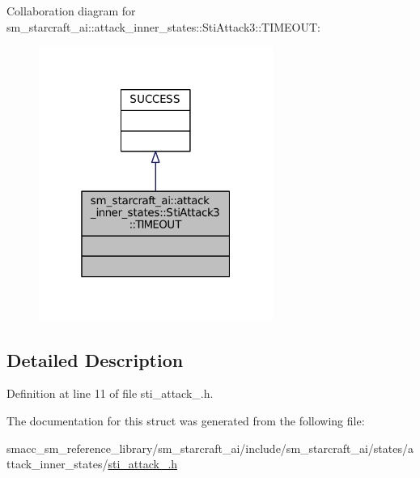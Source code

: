Collaboration diagram for sm\+\_\+starcraft\+\_\+ai\+:\+:attack\+\_\+inner\+\_\+states\+:\+:Sti\+Attack3\+:\+:T\+I\+M\+E\+O\+UT\+:
\nopagebreak
\begin{figure}[H]
\begin{center}
\leavevmode
\includegraphics[width=217pt]{structsm__starcraft__ai_1_1attack__inner__states_1_1StiAttack3_1_1TIMEOUT__coll__graph}
\end{center}
\end{figure}


\subsection{Detailed Description}


Definition at line 11 of file sti\+\_\+attack\+\_.\+h.



The documentation for this struct was generated from the following file\+:\begin{DoxyCompactItemize}
\item 
smacc\+\_\+sm\+\_\+reference\+\_\+library/sm\+\_\+starcraft\+\_\+ai/include/sm\+\_\+starcraft\+\_\+ai/states/attack\+\_\+inner\+\_\+states/\hyperlink{sti__attack__3_8h}{sti\+\_\+attack\+\_.\+h}\end{DoxyCompactItemize}
